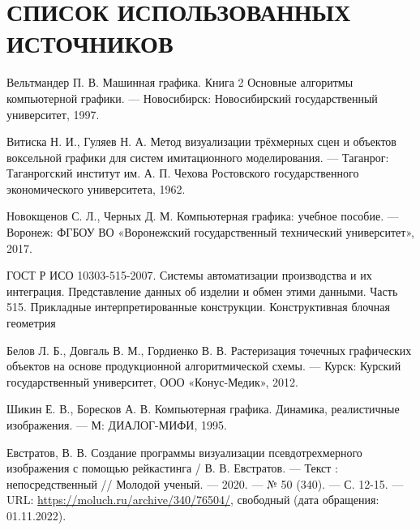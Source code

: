 \section*{СПИСОК ИСПОЛЬЗОВАННЫХ ИСТОЧНИКОВ}

\begingroup
\renewcommand{\section}[2]{}

\begin{thebibliography}{}
	
	Вельтмандер П. В. Машинная графика. Книга 2 Основные алгоритмы компьютерной графики. --- Новосибирск: Новосибирский государственный университет, 1997.
	
	Витиска Н. И., Гуляев Н. А. Метод визуализации трёхмерных сцен и объектов воксельной графики для систем имитационного моделирования. --- Таганрог: Таганрогский институт им. А. П. Чехова Ростовского государственного экономического университета, 1962.
	
	Новокщенов С. Л., Черных Д. М. Компьютерная графика: учебное пособие. --- Воронеж: ФГБОУ ВО
	«Воронежский государственный технический университет», 2017.
	
	ГОСТ Р ИСО 10303-515-2007. Системы автоматизации производства и их интеграция. Представление данных об изделии и обмен этими данными. Часть 515. Прикладные интерпретированные конструкции. Конструктивная блочная геометрия
	
	Белов Л. Б., Довгаль В. М., Гордиенко В. В. Растеризация точечных графических объектов на основе продукционной алгоритмической схемы. --- Курск: Курский государственный университет, ООО «Конус-Медик», 2012.
	
	Шикин Е. В., Боресков А. В. Компьютерная графика. Динамика, реалистичные изображения. --- М: ДИАЛОГ-МИФИ, 1995.
	
	Евстратов, В. В. Создание программы визуализации псевдотрехмерного изображения с помощью рейкастинга / В. В. Евстратов. — Текст : непосредственный // Молодой ученый. — 2020. — № 50 (340). — С. 12-15. — URL: \url{https://moluch.ru/archive/340/76504/}, свободный (дата обращения: 01.11.2022).
	

\end{thebibliography}
